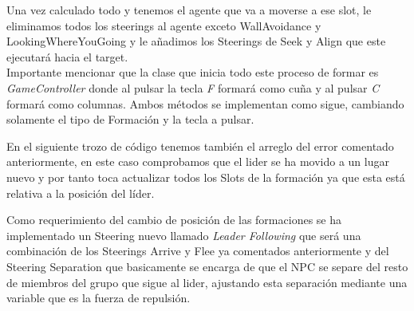 Una vez calculado todo y tenemos el agente que va a moverse a ese slot, le eliminamos todos los steerings al agente exceto WallAvoidance y LookingWhereYouGoing y le añadimos los Steerings de Seek y Align que este ejecutará hacia el target.\\

Importante mencionar que la clase que inicia todo este proceso de formar es \textit{GameController} donde al pulsar la tecla \textit{F} formará como cuña y al pulsar \textit{C} formará como columnas.  Ambos métodos se implementan como sigue, cambiando solamente el tipo de Formación y la tecla a pulsar. 


En el siguiente trozo de código tenemos también el arreglo del error comentado anteriormente, en este caso comprobamos que el lider se ha movido a un lugar nuevo y por tanto toca actualizar todos los Slots de la formación ya que esta está relativa a la posición del líder.



Como requerimiento del cambio de posición de las formaciones se ha implementado un Steering nuevo llamado \textit{Leader Following} que será una combinación de los Steerings Arrive y Flee ya comentados anteriormente y del Steering Separation que basicamente se encarga de que el NPC se separe del resto de miembros del grupo que sigue al lider, ajustando esta separación mediante una variable que es la fuerza de repulsión. 
